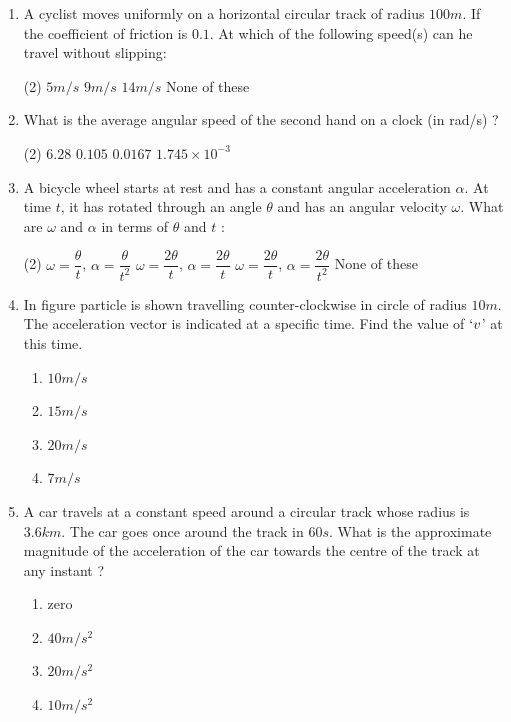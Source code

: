 \documentclass{article}
\begin{document}
\begin{enumerate}

\item A cyclist moves uniformly on a horizontal circular track of radius $100m$. If the coefficient of friction is $0.1$. At which of the following speed(s) can he travel without slipping:
\begin{tasks}(2)
\task $5 m/s$
\task $9 m/s$
\task $14 m/s$
\task None of these
\end{tasks}


\item What is the average angular speed of the second hand on a clock (in rad/s) ?
\begin{tasks}(2)
\task $6.28$
\task $0.105$
\task $0.0167$
\task $1.745 \times 10^{-3}$
\end{tasks}



\item A bicycle wheel starts at rest and has a constant angular acceleration $\alpha$. At time $t$, it has rotated through an angle $\theta$ and has an angular velocity $\omega$. What are $\omega$ and $\alpha$ in terms of $\theta$ and $t$ :
\begin{tasks}(2)
\task $\omega = \dfrac{\theta}{t}$, $\alpha=\dfrac{\theta}{t^2}$
\task $\omega = \dfrac{2\theta}{t}$, $\alpha=\dfrac{2\theta}{t}$
\task $\omega = \dfrac{2\theta}{t}$, $\alpha=\dfrac{2\theta}{t^2}$
\task None of these
\end{tasks}

\item In figure particle is shown travelling counter-clockwise in circle of radius $10 m$. The acceleration vector is indicated at a specific time. Find the value of $`v$' at this time.
\begin{multicols}{2}
\begin{enumerate}
\item $10m/s$
\item $15 m/s$
\item $20 m/s$
\item $7 m/s$
\end{enumerate}
\end{multicols}

\item A car travels at a constant speed around a circular track whose radius is $3.6 km$. The car goes once around the track in $60s$. What is the approximate magnitude of the acceleration of the car towards the centre of the track at any instant ?
\begin{multicols}{2}
\begin{enumerate}
\item zero
\item $40m/s^2$
\item $20 m/s^2$
\item $10 m/s^2$
\end{enumerate}
\end{multicols}


\end{enumerate}
\end{document}
